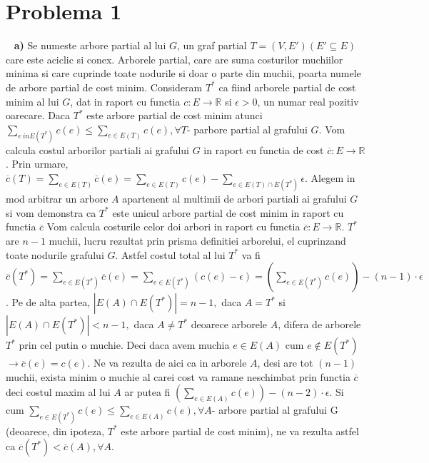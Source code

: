 \documentclass{article}
\begin{document}
\section{Problema 1}
\  
\newline
\newline
\textbf{a)}
Se numeste arbore partial al lui $G$, un graf partial $T=(V, E')(E'\subseteq E)$ care este aciclic si conex. Arborele partial, care are suma costurilor muchiilor minima si care cuprinde toate nodurile si doar o parte din muchii, poarta numele de arbore partial de cost minim.
Consideram $T^*$ ca fiind arborele partial de cost minim al lui $G$, dat in raport cu functia $c:E \rightarrow \mathbb{R}$ si $\epsilon>0$, un numar real pozitiv oarecare. 
\newline
\newline
Daca $T^*$ este arbore partial de cost minim atunci $\sum_{e\ in E(T^*)} c(e) \leq \sum_{e \in E(T)} c(e), \forall T$- parbore partial al grafului $G$.
Vom calcula costul arborilor partiali ai grafului $G$ in raport cu functia de cost $\overline{c}: E \rightarrow \mathbb{R}$. Prin urmare, $\overline{c}(T)= \sum_{e \in E(T)} \overline{c}(e)=\sum_{e \in E(T)} c(e) - \sum_{e \in E(T) \cap E(T^*)}\epsilon$.
Alegem in mod arbitrar un arbore $A$ apartenent al multimii de arbori partiali ai grafului $G$ si vom demonstra ca $T^*$ este unicul arbore partial de cost minim in raport cu functia $\overline c$ Vom calcula costurile celor doi arbori in raport cu functia $\overline{c}:E \rightarrow \mathbb{R}$. $T^*$ are $n-1$ muchii, lucru rezultat prin prisma definitiei arborelui, el cuprinzand toate nodurile grafului $G$. Astfel costul total al lui $T^*$ va fi $\overline{c}(T^*)= \sum_ {e \in E(T^*)} \overline{c}(e)=\sum_{e \in E(T^*)}(c(e)- \epsilon)=( \sum_{e \in E(T^*)}c(e) )-(n-1)\cdot \epsilon$. 
\newline
\newline
Pe de alta partea, $|E(A) \cap E(T^*)| = n-1,$ daca $A=T^*$ si $|E(A) \cap E(T^*)| < n-1,$ daca $A \not =T^*$ deoarece arborele $A$, difera de arborele $T^*$ prin cel putin o muchie. Deci daca avem muchia $e \in E(A)$ cum $e \not \in E(T^*)$ $\rightarrow \overline{c}(e)= c(e)$. Ne va rezulta de aici ca in arborele $A$, desi are tot $(n-1)$ muchii, exista minim o muchie al carei cost va ramane neschimbat prin functia $\overline{c}$ deci costul maxim al lui $A$ ar putea fi $(\sum_{e \in E(A)} c(e)) - (n-2) \cdot \epsilon$. Si cum $\sum_{e \in E(T^*)} c(e) \leq \sum_{e \in E(A)}c(e), \forall A$- arbore partial al grafului G (deoarece, din ipoteza, $T^*$ este arbore partial de cost minim), ne va rezulta astfel ca $\overline{c}(T^*)<\overline{c}(A), \forall A$.
\end{document}
